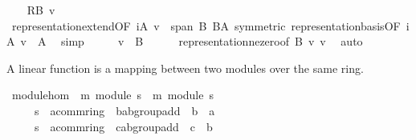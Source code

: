 \begin{isabellebody}
\ \ \isamarkupfalse%
\ {\isachardoublequoteopen}{\isacharquery}{\kern0pt}RB\ v\ {\isacharequal}{\kern0pt}\ {}{\isachardoublequoteclose}\isanewline
\ \ \ \ \isamarkupfalse%
\ representation{\isacharunderscore}{\kern0pt}extend{\isacharbrackleft}{\kern0pt}OF\ iA\ {\isacartoucheopen}v\ {\isasymin}\ span\ B{\isacartoucheclose}\ BA{\isacharcomma}{\kern0pt}\ symmetric{\isacharbrackright}{\kern0pt}\ representation{\isacharunderscore}{\kern0pt}basis{\isacharbrackleft}{\kern0pt}OF\ iA\ {\isacartoucheopen}v\ {\isasymin}\ A{\isacartoucheclose}{\isacharbrackright}{\kern0pt}\ \isamarkupfalse%
\ simp\isanewline
\ \ \isamarkupfalse%
\ \isamarkupfalse%
\ {\isachardoublequoteopen}v\ {\isasymin}\ B{\isachardoublequoteclose}\isanewline
\ \ \ \ \isamarkupfalse%
\ representation{\isacharunderscore}{\kern0pt}ne{\isacharunderscore}{\kern0pt}zero{\isacharbrackleft}{\kern0pt}of\ B\ v\ v{\isacharbrackright}{\kern0pt}\ \isamarkupfalse%
\ auto\isanewline
{}\isamarkupfalse%
%
\endisatagproof
{\isafoldproof}%
%
\isadelimproof
\isanewline
%
\endisadelimproof
\isanewline
{}\isamarkupfalse%
%
\begin{isamarkuptext}%
A linear function is a mapping between two modules over the same ring.%
\end{isamarkuptext}\isamarkuptrue%
\isamarkupfalse%
\ module{\isacharunderscore}{\kern0pt}hom\ {\isacharequal}{\kern0pt}\ m{}{\isacharcolon}{\kern0pt}\ module\ s{}\ {\isacharplus}{\kern0pt}\ m{}{\isacharcolon}{\kern0pt}\ module\ s{}\isanewline
\ \ \ \ \ s{}\ {\isacharcolon}{\kern0pt}{\isacharcolon}{\kern0pt}\ {\isachardoublequoteopen}{\isacharprime}{\kern0pt}a{\isacharcolon}{\kern0pt}{\isacharcolon}{\kern0pt}comm{\isacharunderscore}{\kern0pt}ring{\isacharunderscore}{\kern0pt}{}\ {\isasymRightarrow}\ {\isacharprime}{\kern0pt}b{\isacharcolon}{\kern0pt}{\isacharcolon}{\kern0pt}ab{\isacharunderscore}{\kern0pt}group{\isacharunderscore}{\kern0pt}add\ {\isasymRightarrow}\ {\isacharprime}{\kern0pt}b{\isachardoublequoteclose}\ {\isacharparenleft}{\kern0pt}\ {\isachardoublequoteopen}{\isacharasterisk}{\kern0pt}a{\isachardoublequoteclose}\ {}{}{\isacharparenright}{\kern0pt}\isanewline
\ \ \ \ \ s{}\ {\isacharcolon}{\kern0pt}{\isacharcolon}{\kern0pt}\ {\isachardoublequoteopen}{\isacharprime}{\kern0pt}a{\isacharcolon}{\kern0pt}{\isacharcolon}{\kern0pt}comm{\isacharunderscore}{\kern0pt}ring{\isacharunderscore}{\kern0pt}{}\ {\isasymRightarrow}\ {\isacharprime}{\kern0pt}c{\isacharcolon}{\kern0pt}{\isacharcolon}{\kern0pt}ab{\isacharunderscore}{\kern0pt}group{\isacharunderscore}{\kern0pt}add\ {\isasymRightarrow}\ {\isacharprime}{\kern0pt}c{\isachardoublequoteclose}\ {\isacharparenleft}{\kern0pt}\ {\isachardoublequoteopen}{\isacharasterisk}{\kern0pt}b{\isachardoublequoteclose}\ {}{}{\isacharparenright}{\kern0pt}\ {\isacharplus}{\kern0pt}\isanewline

\end{isabellebody}
